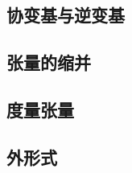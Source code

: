 \vspace{1em}

\subsection{协变基与逆变基}

\vspace{1em}
\subsection{张量的缩并}

\vspace{1em}
\subsection{度量张量}

\vspace{1em}
\subsection{外形式}



\newpage


